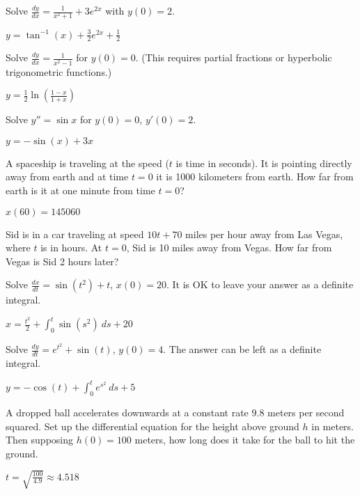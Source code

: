 \begin{exercise}
Solve $\frac{dy}{dx} = \frac{1}{x^2 + 1} + 3e^{2x}$ with $y(0) =2$. 
\end{exercise}
\comboSol{%
}
{%
$y = \tan^{-1}(x) + \frac{3}{2}e^{2x} + \frac{1}{2}$
}

\begin{exercise}
Solve $\frac{dy}{dx} = \frac{1}{x^2-1}$ for $y(0)=0$. (This requires partial fractions or hyperbolic trigonometric functions.)
\end{exercise}
\comboSol{%
}
{%
$y = \frac{1}{2}\ln\left(\frac{1-x}{1+x}\right)$
}

\begin{exercise}[harder]
Solve $y'' = \sin x$ for $y(0)=0$, $y'(0) = 2$.
\end{exercise}
\comboSol{%
}
{%
$y = -\sin(x) + 3x$
}

\begin{exercise}
A spaceship is traveling at the speed  ($t$ is
time in seconds).  It is pointing directly away from earth and at time $t=0$
it is 1000 kilometers from earth.  How far from earth is it at one minute from
time $t=0$?
\end{exercise}
\comboSol{%
}
{%
$x(60) = 145060$
}

\begin{exercise}\ansMark
Sid is in a car traveling at speed $10t+70$ miles per hour away from Las Vegas,
where $t$ is in hours.  At $t=0$, Sid is 10 miles away from Vegas.  How
far from Vegas is Sid 2 hours later?
\end{exercise}

\begin{exercise}
Solve $\frac{dx}{dt} = \sin(t^2)+t$, $x(0)=20$.  It is OK to leave your
answer as a definite integral.
\end{exercise}
\comboSol{%
}
{%
$x = \frac{t^2}{2} + \int_0^t \sin(s^2)\ ds + 20$
}

\begin{exercise}
Solve $\frac{dy}{dt} = e^{t^2} + \sin(t)$, $y(0) = 4$. The answer can be left as a definite integral. 
\end{exercise}
\comboSol{%
}
{%
$y = -\cos(t) + \int_0^t e^{s^2}\ ds + 5$
}

\begin{exercise}
A dropped ball accelerates downwards at a constant rate $9.8$ meters per second
squared.  Set up the differential equation for the height above ground $h$ in meters.
Then supposing $h(0) = 100$ meters, how long does it take for the ball to hit
the ground.
\end{exercise}
\comboSol{%
}
{%
$t = \sqrt{\frac{100}{4.9}} \approx 4.518$
}

